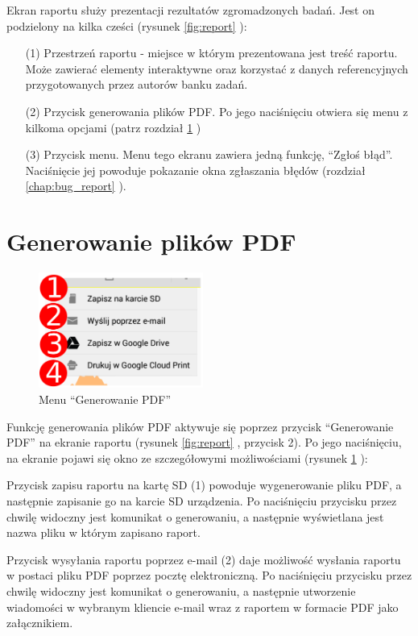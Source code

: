 \documentclass[a4paper,10pt,twosided]{book}
\newcommand{\refwithpage}[3]{
\ref{#1}\ifthenelse{\equal{\thepage}{\pageref{#1}}}{}{#2\pageref{#1}#3}%
}
\newcommand{\ppref}[1]{\refwithpage{#1}{ -- strona }{}}
\begin{document}
Ekran raportu służy prezentacji rezultatów zgromadzonych badań. Jest on podzielony na kilka cześci (rysunek \ppref{fig:report}):

\begin{enumerate}
\item[(1)] Przestrzeń raportu - miejsce w którym prezentowana jest treść raportu. Może zawierać elementy interaktywne oraz korzystać z danych referencyjnych przygotowanych przez autorów banku zadań.
\item[(2)] Przycisk generowania plików PDF. Po jego naciśnięciu otwiera się menu z kilkoma opcjami (patrz rozdział \ppref{sec:report_pdf})
\item[(3)] Przycisk menu. Menu tego ekranu zawiera jedną funkcję, ``Zgłoś błąd''. Naciśnięcie jej powoduje pokazanie okna zgłaszania błędów (rozdział \ppref{chap:bug_report}).
\end{enumerate}


\section{Generowanie plików PDF}
\label{sec:report_pdf}

\begin{figure}
\includegraphics[width=0.48\textwidth]{report_pdfmenu.pdf}
\caption{Menu ``Generowanie PDF''}
\label{fig:report_pdfmenu}
\end{figure}

Funkcję generowania plików PDF aktywuje się poprzez przycisk ``Generowanie PDF'' na ekranie raportu (rysunek \ppref{fig:report}, przycisk 2). Po jego naciśnięciu, na ekranie pojawi się okno ze szczegółowymi możliwościami (rysunek \ppref{fig:report_pdfmenu}):

Przycisk zapisu raportu na kartę SD (1) powoduje wygenerowanie pliku PDF, a następnie zapisanie go na karcie SD urządzenia. Po naciśnięciu przycisku przez chwilę widoczny jest komunikat o generowaniu, a następnie wyświetlana jest nazwa pliku w którym zapisano raport.

Przycisk wysyłania raportu poprzez e-mail (2) daje możliwość wysłania raportu w postaci pliku PDF poprzez pocztę elektroniczną. Po naciśnięciu przycisku przez chwilę widoczny jest komunikat o generowaniu, a następnie utworzenie wiadomości w wybranym kliencie e-mail wraz z raportem w formacie PDF jako załącznikiem.
\end{document}
